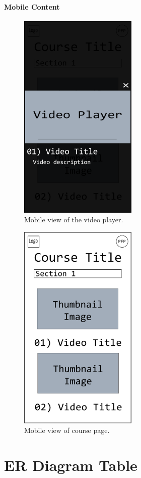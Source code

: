 \documentclass{article}
\begin{document}
\paragraph{Mobile Content}
\vspace{\baselineskip}
\begin{figure}[h!]
    \caption{Mobile view of the video player.}
    \includegraphics[height=10cm]{mobile_course_video}
\end{figure}
\begin{figure}[h!]
    \caption{Mobile view of course page.}
    \includegraphics[height=10cm]{mobile_course_page}
\end{figure}


\section{ER Diagram Table}
\end{document}
